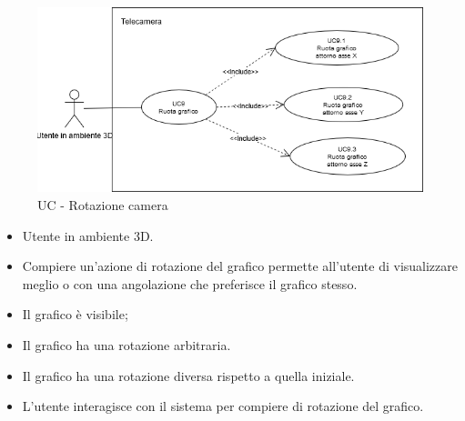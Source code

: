 \begin{figure}[h!]
    \centering
    \includegraphics[scale=0.7]{template/images/UC9.png}
    \caption{UC - Rotazione camera}
\end{figure}
\UCdsc
{ %
    \begin{itemize}
        \item Utente in ambiente 3D.
    \end{itemize}
}
{ %
    \begin{itemize}
        \item Compiere un'azione di rotazione del grafico permette all'utente di visualizzare meglio o con una angolazione che preferisce il grafico stesso.
    \end{itemize}
}
{ %
    \begin{itemize}
        \item Il grafico è visibile;
        \item Il grafico ha una rotazione arbitraria.
    \end{itemize}
}
{ %
    \begin{itemize}
        \item Il grafico ha una rotazione diversa rispetto a quella iniziale.
    \end{itemize}
}
{ %
    \begin{itemize}
        \item L'utente interagisce con il sistema per compiere di rotazione del grafico.
    \end{itemize}
}

